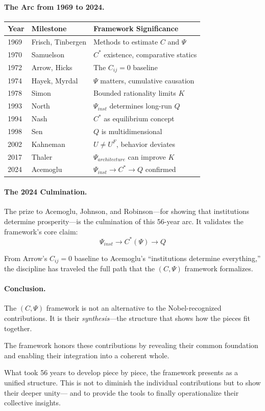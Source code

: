 \paragraph{The Arc from 1969 to 2024.}
\begin{center}
\renewcommand{\arraystretch}{1.2}
\begin{tabular}{lll}
\hline
\textbf{Year} & \textbf{Milestone} & \textbf{Framework Significance} \\
\hline
1969 & Frisch, Tinbergen & Methods to estimate $C$ and $\Psi$ \\
1970 & Samuelson & $C^*$ existence, comparative statics \\
1972 & Arrow, Hicks & The $C_{ij} = 0$ baseline \\
1974 & Hayek, Myrdal & $\Psi$ matters, cumulative causation \\
1978 & Simon & Bounded rationality limits $K$ \\
1993 & North & $\Psi_{inst}$ determines long-run $Q$ \\
1994 & Nash & $C^*$ as equilibrium concept \\
1998 & Sen & $Q$ is multidimensional \\
2002 & Kahneman & $U \neq U^F$, behavior deviates \\
2017 & Thaler & $\Psi_{architecture}$ can improve $K$ \\
2024 & Acemoglu & $\Psi_{inst} \to C^* \to Q$ confirmed \\
\hline
\end{tabular}
\end{center}

\paragraph{The 2024 Culmination.}
The prize to Acemoglu, Johnson, and Robinson---for showing that institutions
determine prosperity---is the culmination of this 56-year arc. It validates
the framework's core claim:
\begin{equation}
  \Psi_{inst} \to C^*(\Psi) \to Q
\end{equation}

From Arrow's $C_{ij} = 0$ baseline to Acemoglu's ``institutions determine everything,''
the discipline has traveled the full path that the $(C, \Psi)$ framework formalizes.

\paragraph{Conclusion.}
The $(C, \Psi)$ framework is not an alternative to the Nobel-recognized contributions.
It is their \emph{synthesis}---the structure that shows how the pieces fit together.

The framework honors these contributions by revealing their common foundation
and enabling their integration into a coherent whole.

What took 56 years to develop piece by piece, the framework presents as a unified structure.
This is not to diminish the individual contributions but to show their deeper unity---
and to provide the tools to finally operationalize their collective insights.


